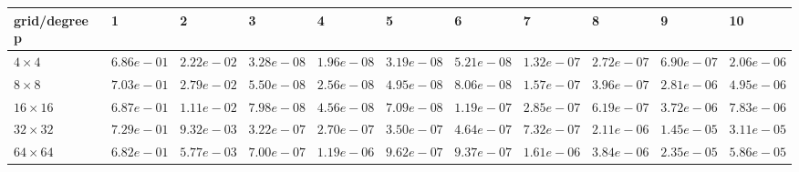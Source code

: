 \begin{tabular}{lllllllllll}
\hline
 grid/degree p   & 1          & 2          & 3          & 4          & 5          & 6          & 7          & 8          & 9          & 10         \\
\hline
 $4 \times 4$    & $6.86e-01$ & $2.22e-02$ & $3.28e-08$ & $1.96e-08$ & $3.19e-08$ & $5.21e-08$ & $1.32e-07$ & $2.72e-07$ & $6.90e-07$ & $2.06e-06$ \\
 $8 \times 8$    & $7.03e-01$ & $2.79e-02$ & $5.50e-08$ & $2.56e-08$ & $4.95e-08$ & $8.06e-08$ & $1.57e-07$ & $3.96e-07$ & $2.81e-06$ & $4.95e-06$ \\
 $16 \times 16$  & $6.87e-01$ & $1.11e-02$ & $7.98e-08$ & $4.56e-08$ & $7.09e-08$ & $1.19e-07$ & $2.85e-07$ & $6.19e-07$ & $3.72e-06$ & $7.83e-06$ \\
 $32 \times 32$  & $7.29e-01$ & $9.32e-03$ & $3.22e-07$ & $2.70e-07$ & $3.50e-07$ & $4.64e-07$ & $7.32e-07$ & $2.11e-06$ & $1.45e-05$ & $3.11e-05$ \\
 $64 \times 64$  & $6.82e-01$ & $5.77e-03$ & $7.00e-07$ & $1.19e-06$ & $9.62e-07$ & $9.37e-07$ & $1.61e-06$ & $3.84e-06$ & $2.35e-05$ & $5.86e-05$ \\
\hline
\end{tabular}